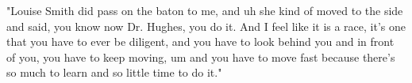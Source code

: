 "Louise Smith did pass on the baton to me, and uh she kind of moved to the side and said, you know now Dr. Hughes, you do it. And I feel like it is a race, it's one that you have to ever be diligent, and you have to look behind you and in front of you, you have to keep moving, um and you have to move fast because there's so much to learn and so little time to do it."